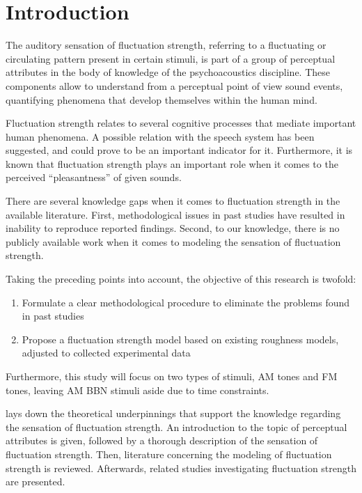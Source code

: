 \documentclass[../main.tex]{subfiles}
\begin{document}
\chapter{Introduction}
\label{cha:introduction}

The auditory sensation of fluctuation strength, referring to a fluctuating or
circulating pattern present in certain stimuli, is part of a group of perceptual
attributes in the body of knowledge of the psychoacoustics discipline. These
components allow to understand from a perceptual point of view sound events,
quantifying phenomena that develop themselves within the human mind.

Fluctuation strength relates to several cognitive processes that mediate
important human phenomena. A possible relation with the speech system has been
suggested, and could prove to be an important indicator for it. Furthermore, it
is known that fluctuation strength plays an important role when it comes to the
perceived ``pleasantness'' of given sounds.

There are several knowledge gaps when it comes to fluctuation strength in the
available literature. First, methodological issues in past studies have resulted
in inability to reproduce reported findings. Second, to our knowledge, there is
no publicly available work when it comes to modeling the sensation of
fluctuation strength.

Taking the preceding points into account, the objective of this research is
twofold:
\begin{enumerate}
  \item Formulate a clear methodological procedure to eliminate the problems
    found in past studies
  \item Propose a fluctuation strength model based on existing roughness models,
    adjusted to collected experimental data
\end{enumerate}

Furthermore, this study will focus on two types of stimuli, \gls{AM} tones and
\gls{FM} tones, leaving \gls{AM} \gls{BBN} stimuli aside due to time
constraints.

 lays down the theoretical underpinnings that support the
knowledge regarding the sensation of fluctuation strength. An introduction to
the topic of perceptual attributes is given, followed by a thorough description
of the sensation of fluctuation strength. Then, literature concerning the
modeling of fluctuation strength is reviewed. Afterwards, related studies
investigating fluctuation strength are presented.
\end{document}
